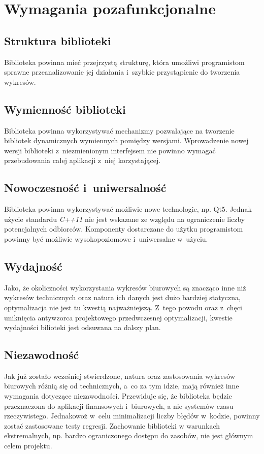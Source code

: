 \documentclass[11pt,twoside,a4paper,final]{article}
\begin{document}
\section{Wymagania pozafunkcjonalne}
\subsection{Struktura biblioteki}
Biblioteka powinna mieć przejrzystą strukturę, która umożliwi programistom sprawne przeanalizowanie jej działania i~szybkie przystąpienie do tworzenia wykresów.

\subsection{Wymienność biblioteki}
Biblioteka powinna wykorzystywać mechanizmy pozwalające na tworzenie bibliotek dynamicznych wymiennych pomiędzy wersjami. Wprowadzenie nowej wersji biblioteki z~niezmienionym interfejsem nie powinno wymagać przebudowania całej aplikacji z~niej korzystającej.

\subsection{Nowoczesność i~uniwersalność}
Biblioteka powinna wykorzystywać możliwie nowe technologie, np. Qt5. Jednak użycie standardu \textit{C++11} nie jest wskazane ze względu na ograniczenie liczby potencjalnych odbiorców. Komponenty dostarczane do użytku programistom powinny być możliwie wysokopoziomowe i~uniwersalne w~użyciu.

\subsection{Wydajność}
Jako, że okoliczności wykorzystania wykresów biurowych są znacząco inne niż wykresów technicznych oraz natura ich danych jest dużo bardziej statyczna, optymalizacja nie jest tu kwestią najważniejszą. 
Z~tego powodu oraz z~chęci uniknięcia antywzorca projektowego przedwczesnej optymalizacji, kwestie wydajności bilioteki jest odsuwana na dalszy plan.

\subsection{Niezawodność}
Jak już zostało wcześniej stwierdzone, natura oraz zastosowania wykresów biurowych różnią się od technicznych, a~co za tym idzie, mają również inne wymagania dotyczące niezawodności. Przewiduje się, że biblioteka będzie przeznaczona do aplikacji finansowych i~biurowych, a nie systemów czasu rzeczywistego. Jednakowoż w~celu minimalizacji liczby błędów w~kodzie, powinny zostać zastosowane testy regresji. Zachowanie biblioteki w warunkach ekstremalnych, np. bardzo ograniczonego dostępu do zasobów, nie jest głównym celem projektu.
\end{document}
